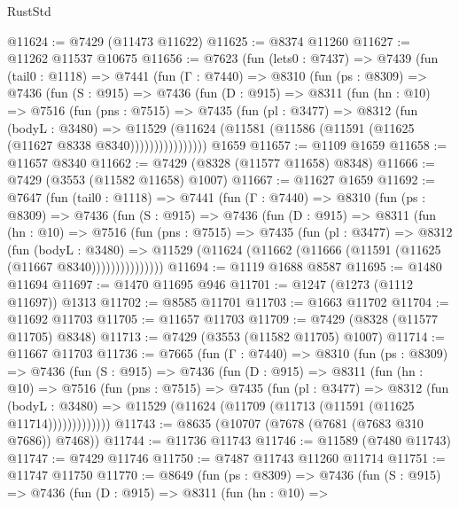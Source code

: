 \begin{lexlean}{RustStd}
\begin{coremodule}
@11624 := @7429 (@11473 @11622)
@11625 := @8374 @11260
@11627 := @11262 @11537 @10675
@11656 := @7623
    (fun (lets0 : @7437) =>
    @7439
      (fun (tail0 : @1118) =>
      @7441
        (fun (Γ : @7440) =>
        @8310
          (fun (ps : @8309) =>
          @7436
            (fun (S : @915) =>
            @7436
              (fun (D : @915) =>
              @8311
                (fun (hn : @10) =>
                @7516
                  (fun (pns : @7515) =>
                  @7435
                    (fun (pl : @3477) =>
                    @8312
                      (fun (bodyL : @3480) =>
                      @11529
                        (@11624 (@11581 (@11586 (@11591 (@11625 (@11627 @8338 @8340))))))))))))))))
    @1659
@11657 := @1109 @1659
@11658 := @11657 @8340
@11662 := @7429 (@8328 (@11577 @11658) @8348)
@11666 := @7429 (@3553 (@11582 @11658) @1007)
@11667 := @11627 @1659
@11692 := @7647
    (fun (tail0 : @1118) =>
    @7441
      (fun (Γ : @7440) =>
      @8310
        (fun (ps : @8309) =>
        @7436
          (fun (S : @915) =>
          @7436
            (fun (D : @915) =>
            @8311
              (fun (hn : @10) =>
              @7516
                (fun (pns : @7515) =>
                @7435
                  (fun (pl : @3477) =>
                  @8312
                    (fun (bodyL : @3480) =>
                    @11529 (@11624 (@11662 (@11666 (@11591 (@11625 (@11667 @8340)))))))))))))))
@11694 := @1119 @1688 @8587
@11695 := @1480 @11694
@11697 := @1470 @11695 @946
@11701 := @1247 (@1273 (@1112 @11697)) @1313
@11702 := @8585 @11701
@11703 := @1663 @11702
@11704 := @11692 @11703
@11705 := @11657 @11703
@11709 := @7429 (@8328 (@11577 @11705) @8348)
@11713 := @7429 (@3553 (@11582 @11705) @1007)
@11714 := @11667 @11703
@11736 := @7665
    (fun (Γ : @7440) =>
    @8310
      (fun (ps : @8309) =>
      @7436
        (fun (S : @915) =>
        @7436
          (fun (D : @915) =>
          @8311
            (fun (hn : @10) =>
            @7516
              (fun (pns : @7515) =>
              @7435
                (fun (pl : @3477) =>
                @8312
                  (fun (bodyL : @3480) =>
                  @11529 (@11624 (@11709 (@11713 (@11591 (@11625 @11714)))))))))))))
@11743 := @8635 (@10707 (@7678 (@7681 (@7683 @310 @7686)) @7468))
@11744 := @11736 @11743
@11746 := @11589 (@7480 @11743)
@11747 := @7429 @11746
@11750 := @7487 @11743 @11260 @11714
@11751 := @11747 @11750
@11770 := @8649
    (fun (ps : @8309) =>
    @7436
      (fun (S : @915) =>
      @7436
        (fun (D : @915) =>
        @8311
          (fun (hn : @10) =>

\end{coremodule}
\end{lexlean}

